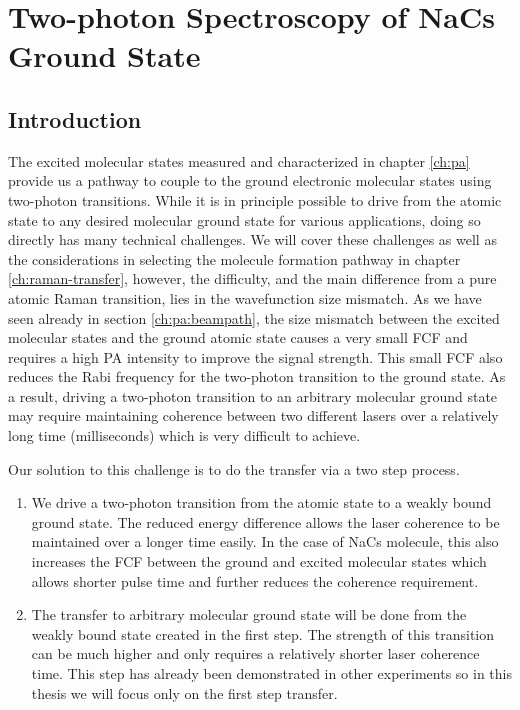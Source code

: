 
\chapter{Two-photon Spectroscopy of NaCs Ground State}
\label{ch:raman-spectroscopy}

\section{Introduction}
\label{ch:raman-spectroscopy:introduction}


The excited molecular states measured and characterized in chapter \ref{ch:pa}
provide us a pathway to couple to the ground electronic molecular states
using two-photon transitions.
While it is in principle possible to drive from the atomic state
to any desired molecular ground state for various applications,
doing so directly has many technical challenges.
We will cover these challenges as well as the considerations in selecting
the molecule formation pathway in chapter \ref{ch:raman-transfer},
however, the difficulty, and the main difference from a pure atomic Raman transition,
lies in the wavefunction size mismatch.
As we have seen already in section \ref{ch:pa:beampath},
the size mismatch between the excited molecular states and the ground atomic state
causes a very small FCF and requires a high PA intensity to improve the signal strength.
This small FCF also reduces the Rabi frequency for the two-photon transition to the ground state.
As a result, driving a two-photon transition to an arbitrary molecular ground state
may require maintaining coherence between two different lasers over
a relatively long time (milliseconds) which is very difficult to achieve.

Our solution to this challenge is to do the transfer via a two step process.
\begin{enumerate}
\item We drive a two-photon transition from the atomic state to
  a weakly bound ground state.
  The reduced energy difference allows the laser coherence to be maintained
  over a longer time easily.
  In the case of NaCs molecule, this also increases the FCF
  between the ground and excited molecular states which allows shorter pulse time and
  further reduces the coherence requirement.
\item The transfer to arbitrary molecular ground state will be done from
  the weakly bound state created in the first step.
  The strength of this transition can be much higher
  and only requires a relatively shorter laser coherence time.
  This step has already been demonstrated in other experiments\cite{ni_high_2008}
  so in this thesis we will focus only on the first step transfer.
\end{enumerate}

